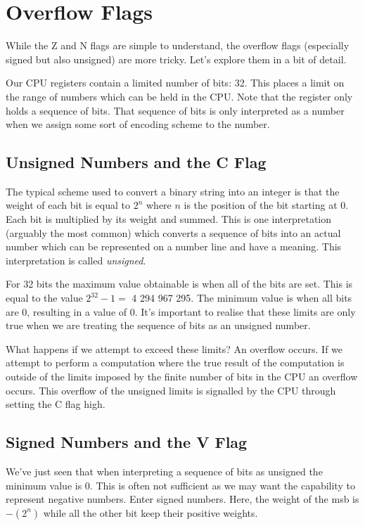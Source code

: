 \section{Overflow Flags}
While the Z and N flags are simple to understand, the overflow flags (especially signed but also unsigned) are more tricky. Let's explore them in a bit of detail. 

Our CPU registers contain a limited number of bits: 32. This places a limit on the range of numbers which can be held in the CPU. Note that the register only holds a sequence of bits. That sequence of bits is only interpreted as a number when we assign some sort of encoding scheme to the number. 

\subsection{Unsigned Numbers and the C Flag}
The typical scheme used to convert a binary string into an integer is that the weight of each bit is equal to $2^{n}$ where $n$ is the position of the bit starting at 0. Each bit is multiplied by its weight and summed. This is one interpretation (arguably the most common) which converts a sequence of bits into an actual number which can be represented on a number line and have a meaning. This interpretation is called \emph{unsigned}.

For 32 bits the maximum value obtainable is when all of the bits are set. This is equal to the value $2^{32} - 1 = $ 4 294 967 295. The minimum value is when all bits are 0, resulting in a value of 0. It's important to realise that these limits are only true when we are treating the sequence of bits as an unsigned number. 

What happens if we attempt to exceed these limits? An overflow occurs. If we attempt to perform a computation where the true result of the computation is outside of the limits imposed by the finite number of bits in the CPU an overflow occurs. This overflow of the unsigned limits is signalled by the CPU through setting the C flag high.

\subsection{Signed Numbers and the V Flag}
We've just seen that when interpreting a sequence of bits as unsigned the minimum value is 0. This is often not sufficient as we may want the capability to represent negative numbers. Enter signed numbers. Here, the weight of the msb is $-(2^{n})$ while all the other bit keep their positive weights. 

